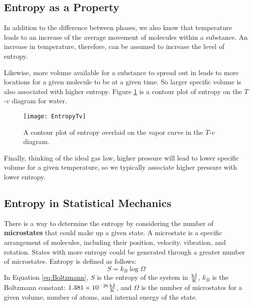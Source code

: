 \subsection{Entropy as a Property}

In addition to the difference between phases, we also know that temperature leads to an increase of the average movement of molecules within a substance.  An increase in temperature, therefore, can be assumed to increase the level of entropy.

Likewise, more volume available for a substance to spread out in leads to more locations for a given molecule to be at a given time.  So larger specific volume is also associated with higher entropy.  Figure \ref{fig:EntropyTv} is a contour plot of entropy on the $T$-$v$ diagram for water.

\begin{figure}[H]
  \centering
  \texttt{[image: EntropyTv]}
  \caption{A contour plot of entropy overlaid on the vapor curve in the $T$-$v$ diagram.}
  \label{fig:EntropyTv}
\end{figure}%

Finally, thinking of the ideal gas law, higher pressure will lead to lower specific volume for a given temperature, so we typically associate higher pressure with lower entropy.

\subsection{Entropy in Statistical Mechanics}

There is a way to determine the entropy by considering the number of {\bf microstates} that could make up a given state.  A microstate is a specific arrangement of molecules, including their position, velocity, vibration, and rotation.  States with more entropy could be generated through a greater number of microstates.  Entropy is defined as follows:
\begin{equation}\label{eq:Boltzmann}
  S = k_B \log \Omega
\end{equation}
In Equation \ref{eq:Boltzmann}, $S$ is the entropy of the system in $\frac{\rm kJ}{\rm K}$, $k_B$ is the Boltzmann constant: $1.381\times 10^{-26}\frac{\rm kJ}{\rm K}$, and $\Omega$ is the number of microstates for a given volume, number of atoms, and internal energy of the state.

